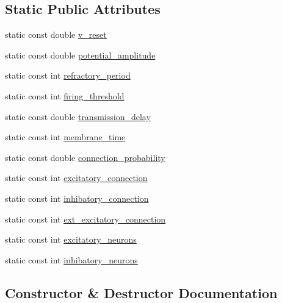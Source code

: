 \subsection*{Static Public Attributes}
\begin{DoxyCompactItemize}
\item 
static const double \hyperlink{class_neuron_a060e99d9c0a3b7309137e4930a5d6440}{v\+\_\+reset}
\item 
static const double \hyperlink{class_neuron_afd59ba07f501d71b910d32772e387b61}{potential\+\_\+amplitude}
\item 
static const int \hyperlink{class_neuron_a6f7525f237c3d299f58c7a3bf42d62a9}{refractory\+\_\+period}
\item 
static const int \hyperlink{class_neuron_a06ea7a20372a1c3bf89396a5f0e5f331}{firing\+\_\+threshold}
\item 
static const double \hyperlink{class_neuron_a7a3978b9b9da2d1873eabae310a82a43}{transmission\+\_\+delay}
\item 
static const int \hyperlink{class_neuron_a61c7512561ec7aa826c7c49614879e3e}{membrane\+\_\+time}
\item 
static const double \hyperlink{class_neuron_a6a33431be5ded570bb95b0574c443e08}{connection\+\_\+probability}
\item 
static const int \hyperlink{class_neuron_a9767a0722e3f8d86e43d9efa90ec0f36}{excitatory\+\_\+connection}
\item 
static const int \hyperlink{class_neuron_aa1809e0164c6de44397f66ab4dddad84}{inhibatory\+\_\+connection}
\item 
static const int \hyperlink{class_neuron_aa151305e976e30c7f5d396a15779c3f3}{ext\+\_\+excitatory\+\_\+connection}
\item 
static const int \hyperlink{class_neuron_ad93c068fdb3a5f1671a321437ab6d155}{excitatory\+\_\+neurons}
\item 
static const int \hyperlink{class_neuron_abaddad04d5a8ac031af69b59ba6127a0}{inhibatory\+\_\+neurons}
\end{DoxyCompactItemize}


\subsection{Constructor \& Destructor Documentation}

